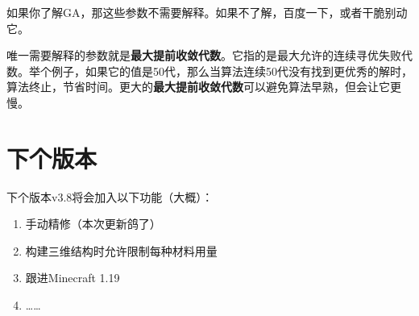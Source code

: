\documentclass[UTF8]{ctexart}
\begin{document}
如果你了解GA，那这些参数不需要解释。如果不了解，百度一下，或者干脆别动它。

唯一需要解释的参数就是\textbf{最大提前收敛代数}。它指的是最大允许的连续寻优失败代数。举个例子，如果它的值是50代，那么当算法连续50代没有找到更优秀的解时，算法终止，节省时间。更大的\textbf{最大提前收敛代数}可以避免算法早熟，但会让它更慢。

\section{下个版本}
    下个版本v3.8将会加入以下功能（大概）：
    \begin{enumerate}
        \item 手动精修（本次更新鸽了）
        \item 构建三维结构时允许限制每种材料用量
        \item 跟进Minecraft 1.19
        \item ……
    \end{enumerate}
\end{document}
